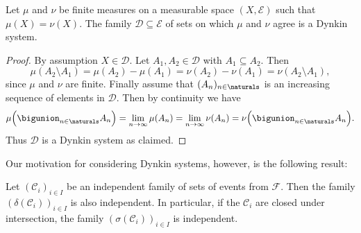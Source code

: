 \documentclass[article, a4paper, 11pt, oneside]{memoir}
\numberwithin{equation}{chapter}
\newcommand{\calE}{\mathcal{E}}
\newcommand{\calF}{\mathcal{F}}
\newcommand{\calC}{\mathcal{C}}
\newcommand{\calD}{\mathcal{D}}
\begin{document}
\begin{lemma}
    \label{thm:finite-measures-agree-on-Dynkin}
    Let $\mu$ and $\nu$ be finite measures on a measurable space $(X,\calE)$ such that $\mu(X) = \nu(X)$. The family $\calD \subseteq \calE$ of sets on which $\mu$ and $\nu$ agree is a Dynkin system.
\end{lemma}

\begin{proof}
    By assumption $X \in \calD$. Let $A_1, A_2 \in \calD$ with $A_1 \subseteq A_2$. Then
    \begin{equation*}
        \mu(A_2 \setminus A_1)
            = \mu(A_2) - \mu(A_1)
            = \nu(A_2) - \nu(A_1)
            = \nu(A_2 \setminus A_1),
    \end{equation*}
    since $\mu$ and $\nu$ are finite. Finally assume that $(A_n)_{n\in\naturals}$ is an increasing sequence of elements in $\calD$. Then by continuity we have
    \begin{equation*}
        \mu \Bigl( \bigunion_{n\in\naturals} A_n \Bigr)
            = \lim_{n\to\infty} \mu(A_n)
            = \lim_{n\to\infty} \nu(A_n)
            = \nu \Bigl( \bigunion_{n\in\naturals} A_n \Bigr).
    \end{equation*}
    Thus $\calD$ is a Dynkin system as claimed.
\end{proof}

Our motivation for considering Dynkin systems, however, is the following result:

\begin{proposition}
    \label{thm:Dynkin-independence}
    Let $(\calC_i)_{i \in I}$ be an independent family of sets of events from $\calF$. Then the family $(\delta(\calC_i))_{i \in I}$ is also independent. In particular, if the $\calC_i$ are closed under intersection, the family $(\sigma(\calC_i))_{i \in I}$ is independent.
\end{proposition}
\end{document}
